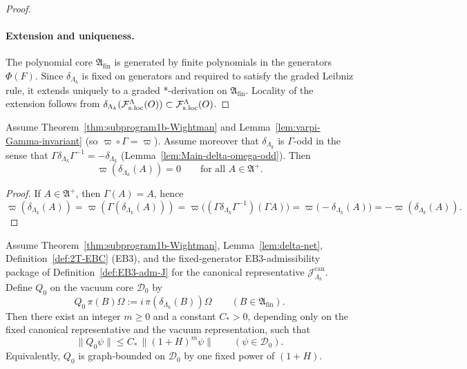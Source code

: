 \begin{proof}
\paragraph{Extension and uniqueness.}
The polynomial core $\mathfrak A_{\mathrm{fin}}$ is generated by finite
polynomials in the generators $\Phi(F)$.  Since \(\delta_{\Lambda_k}\) is fixed on generators
and required to satisfy the graded Leibniz rule, it extends uniquely to a graded
*-derivation on $\mathfrak A_{\mathrm{fin}}$.  Locality of the extension follows
from \(\delta_{\Lambda_k}(\mathcal F_{\mathrm{s.loc}}^\Lambda(O))\subset\mathcal F_{\mathrm{s.loc}}^\Lambda(O)\).
\end{proof}

\begin{lemma}
\label{lem:delta-vacuum-invariant}
Assume Theorem~\ref{thm:subprogram1b-Wightman} and
Lemma~\ref{lem:varpi-Gamma-invariant} (so $\varpi\circ\Gamma=\varpi$). Assume
moreover that \(\delta_{\Lambda_k}\) is \(\Gamma\)-odd in the sense that
\(\Gamma\delta_{\Lambda_k}\Gamma^{-1}=-\delta_{\Lambda_k}\) (Lemma~\ref{lem:Main-delta-omega-odd}). Then
\[
\varpi(\delta_{\Lambda_k}(A))=0\qquad\text{for all }A\in\mathfrak A^{+}.
\]
\end{lemma}

\begin{proof}
If $A\in\mathfrak A^{+}$, then $\Gamma(A)=A$, hence
\[
\varpi(\delta_{\Lambda_k}(A))
=\varpi(\Gamma(\delta_{\Lambda_k}(A)))
=\varpi\big((\Gamma\delta_{\Lambda_k}\Gamma^{-1})(\Gamma A)\big)
=\varpi\big(-\delta_{\Lambda_k}(A)\big)
=-\varpi(\delta_{\Lambda_k}(A)).
\]
\end{proof}

\begin{theorem}
\label{thm:Q0-uniform-graph-bound}
Assume Theorem~\ref{thm:subprogram1b-Wightman}, Lemma~\ref{lem:delta-net},
Definition~\ref{def:2T-EBC} \textnormal{(EB3)}, and the fixed-generator
EB3-admissibility package of Definition~\ref{def:EB3-adm-J} for the canonical
representative \(\mathcal J^{\mathrm{can}}_{\Lambda_k}\). Define \(Q_0\) on the
vacuum core \(\mathcal D_0\) by
\[
Q_0\,\pi(B)\Omega := i\,\pi(\delta_{\Lambda_k}(B))\Omega
\qquad(B\in\mathfrak A_{\mathrm{fin}}).
\]
Then there exist an integer \(m\ge 0\) and a constant \(C_*>0\), depending only
on the fixed canonical representative and the vacuum representation, such that
\[
\|Q_0\psi\|
\le
C_*\,\|(1+H)^m\psi\|
\qquad(\psi\in\mathcal D_0).
\]
Equivalently, \(Q_0\) is graph-bounded on \(\mathcal D_0\) by one fixed power of
\((1+H)\).
\end{theorem}

